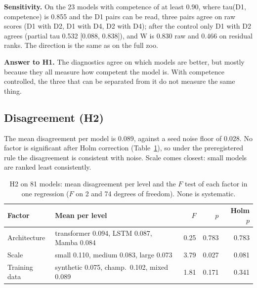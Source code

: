 \documentclass[journal]{IEEEtran}
\begin{document}
\textbf{Sensitivity.} On the 23 models with competence of at least 0.90, where tau(D1, competence) is 0.855 and the
D1 pairs can be read, three pairs agree on raw scores (D1 with D2, D1 with D4, D2 with D4); after the control only
D1 with D2 agrees (partial tau 0.532 [0.088, 0.838]), and W is 0.830 raw and 0.466 on residual ranks. The direction
is the same as on the full zoo.

\textbf{Answer to H1.} The diagnostics agree on which models are better, but mostly because they all measure how
competent the model is. With competence controlled, the three that can be separated from it do not measure the same
thing.

\subsection{Disagreement (H2)}
\label{sec:h2}
The mean disagreement per model is 0.089, against a seed noise floor of 0.028. No factor is significant after Holm
correction (Table~\ref{tab:h2}), so under the preregistered rule the disagreement is consistent with noise. Scale
comes closest: small models are ranked least consistently.

\begin{table}[t]
    \centering
    \caption{H2 on 81 models: mean disagreement per level and the $F$ test of each factor in one regression ($F$ on 2
    and 74 degrees of freedom). None is systematic.}
    \label{tab:h2}
    \footnotesize
    \setlength{\tabcolsep}{3pt}
    \begin{tabular}{l>{\raggedright\arraybackslash}p{2.6cm}rrr}
    \toprule
    Factor & Mean per level & $F$ & $p$ & Holm $p$ \\
    \midrule
    Architecture & transformer 0.094, LSTM 0.087, Mamba 0.084 & 0.25 & 0.783 & 0.783 \\
    Scale & small 0.110, medium 0.083, large 0.073 & 3.79 & 0.027 & 0.081 \\
    Training data & synthetic 0.075, champ.\ 0.102, mixed 0.089 & 1.81 & 0.171 & 0.341 \\
    \bottomrule
    \end{tabular}
\end{table}
\end{document}

